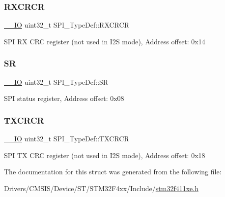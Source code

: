 \subsubsection{\texorpdfstring{R\+X\+C\+R\+CR}{RXCRCR}}
{\footnotesize\ttfamily \hyperlink{core__sc300_8h_aec43007d9998a0a0e01faede4133d6be}{\+\_\+\+\_\+\+IO} uint32\+\_\+t S\+P\+I\+\_\+\+Type\+Def\+::\+R\+X\+C\+R\+CR}

S\+PI RX C\+RC register (not used in I2S mode), Address offset\+: 0x14 \mbox{\label{struct_s_p_i___type_def_a33f3dd6a505d06fe6c466b63be451891}} 
\subsubsection{\texorpdfstring{SR}{SR}}
{\footnotesize\ttfamily \hyperlink{core__sc300_8h_aec43007d9998a0a0e01faede4133d6be}{\+\_\+\+\_\+\+IO} uint32\+\_\+t S\+P\+I\+\_\+\+Type\+Def\+::\+SR}

S\+PI status register, Address offset\+: 0x08 \mbox{\label{struct_s_p_i___type_def_a0b5a7f6383eb478bbcc22a36c5e95ae6}} 
\subsubsection{\texorpdfstring{T\+X\+C\+R\+CR}{TXCRCR}}
{\footnotesize\ttfamily \hyperlink{core__sc300_8h_aec43007d9998a0a0e01faede4133d6be}{\+\_\+\+\_\+\+IO} uint32\+\_\+t S\+P\+I\+\_\+\+Type\+Def\+::\+T\+X\+C\+R\+CR}

S\+PI TX C\+RC register (not used in I2S mode), Address offset\+: 0x18 

The documentation for this struct was generated from the following file\+:\begin{DoxyCompactItemize}
\item 
Drivers/\+C\+M\+S\+I\+S/\+Device/\+S\+T/\+S\+T\+M32\+F4xx/\+Include/\hyperlink{stm32f411xe_8h}{stm32f411xe.\+h}\end{DoxyCompactItemize}

